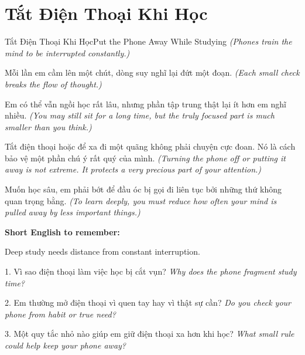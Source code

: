 \section{Tắt Điện Thoại Khi Học}
\begin{truyen}{Tắt Điện Thoại Khi Học}{Put the Phone Away While Studying}
\textit{(Phones train the mind to be interrupted constantly.)}

Mỗi lần em cầm lên một chút, dòng suy nghĩ lại đứt một đoạn.
\textit{(Each small check breaks the flow of thought.)}

Em có thể vẫn ngồi học rất lâu, nhưng phần tập trung thật lại ít hơn em nghĩ nhiều.
\textit{(You may still sit for a long time, but the truly focused part is much smaller than you think.)}

Tắt điện thoại hoặc để xa đi một quãng không phải chuyện cực đoan. Nó là cách bảo vệ một phần chú ý rất quý của mình.
\textit{(Turning the phone off or putting it away is not extreme. It protects a very precious part of your attention.)}
\end{truyen}

\begin{baihoc}
Muốn học sâu, em phải bớt để đầu óc bị gọi đi liên tục bởi những thứ không quan trọng bằng.
\textit{(To learn deeply, you must reduce how often your mind is pulled away by less important things.)}
\end{baihoc}

\begin{ghinhoanh}
\textbf{Short English to remember:}

Deep study needs distance from constant interruption.

\end{ghinhoanh}

\begin{tuhocnhanh}
1. Vì sao điện thoại làm việc học bị cắt vụn? \textit{Why does the phone fragment study time?}

2. Em thường mở điện thoại vì quen tay hay vì thật sự cần? \textit{Do you check your phone from habit or true need?}

3. Một quy tắc nhỏ nào giúp em giữ điện thoại xa hơn khi học? \textit{What small rule could help keep your phone away?}
\end{tuhocnhanh}
\ngancach

